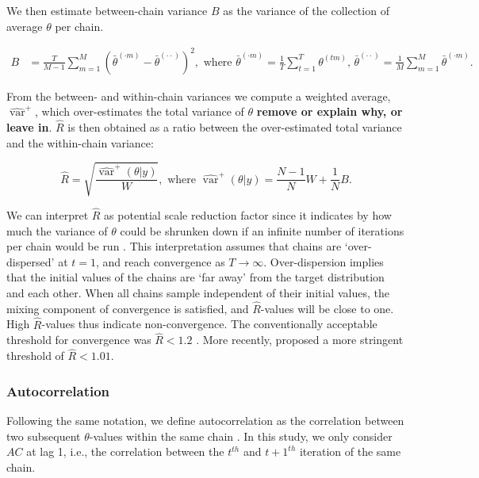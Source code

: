 \documentclass[Royal,times,sageh]{sagej}
\begin{document}
We then estimate between-chain variance \(B\) as the variance of the
collection of average \(\theta\) per chain.

\begin{align*}
B&=\frac{T}{M-1} \sum_{m=1}^{M}\left(\bar{\theta}^{(\cdot m)}-\bar{\theta}^{(\cdot \cdot)}\right)^{2}, \text { where } \bar{\theta}^{(\cdot m)}=\frac{1}{T} \sum_{t=1}^{T} \theta^{(t m)} \text{, } \bar{\theta}^{(\cdot \cdot)}=\frac{1}{M} \sum_{m=1}^{M} \bar{\theta}^{(\cdot m)}. 
\end{align*}

From the between- and within-chain variances we compute a weighted
average, \(\widehat{\operatorname{var}}^{+}\), which over-estimates the
total variance of \(\theta\) \textbf{remove or explain why, or leave
in}. \(\widehat{R}\) is then obtained as a ratio between the
over-estimated total variance and the within-chain variance:

\begin{equation*}
\widehat{R}=\sqrt{\frac{\widehat{\operatorname{var}}^{+}(\theta | y)}{W}},
\text{ where } \widehat{\operatorname{var}}^{+}(\theta | y)=\frac{N-1}{N} W+\frac{1}{N} B.
\end{equation*}

We can interpret \(\widehat{R}\) as potential scale reduction factor
since it indicates by how much the variance of \(\theta\) could be
shrunken down if an infinite number of iterations per chain would be run
\citep{gelm92}. This interpretation assumes that chains are
`over-dispersed' at \(t=1\), and reach convergence as \(T \to \infty\).
Over-dispersion implies that the initial values of the chains are `far
away' from the target distribution and each other. When all chains
sample independent of their initial values, the mixing component of
convergence is satisfied, and \(\widehat{R}\)-values will be close to
one. High \(\widehat{R}\)-values thus indicate non-convergence. The
conventionally acceptable threshold for convergence was
\(\widehat{R} < 1.2\) \citep{gelm92}. More recently, \citet{veht19}
proposed a more stringent threshold of \(\widehat{R} < 1.01\).

\hypertarget{autocorrelation}{%
\subsubsection{Autocorrelation}\label{autocorrelation}}

Following the same notation, we define autocorrelation as the
correlation between two subsequent \(\theta\)-values within the same
chain \citep[p.~147]{lync07}. In this study, we only consider \(AC\) at
lag 1, i.e., the correlation between the \(t^{th}\) and \(t+1^{th}\)
iteration of the same chain.
\end{document}
